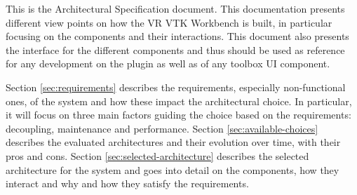This is the Architectural Specification document. This documentation presents different view points on how the VR VTK Workbench is built, in particular focusing on the components and their interactions. This document also presents the interface for the different components and thus should be used as reference for any development on the plugin as well as of any toolbox UI component. 

Section \ref{sec:requirements} describes the requirements, especially non-functional ones, of the system and how these impact the architectural choice. In particular, it will focus on three main factors guiding the choice based on the requirements: decoupling, maintenance and performance. Section \ref{sec:available-choices} describes the evaluated architectures and their evolution over time, with their pros and cons. Section \ref{sec:selected-architecture} describes the selected architecture for the system and goes into detail on the components, how they interact and why and how they satisfy the requirements.

